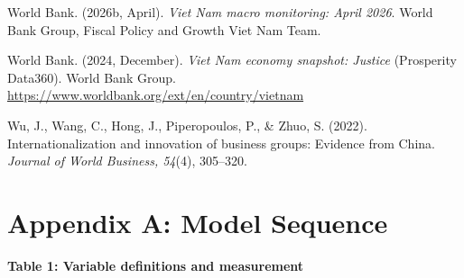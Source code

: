 \documentclass[
  12pt]{article}
\begin{document}
World Bank. (2026b, April). \emph{Viet Nam macro monitoring: April
2026}. World Bank Group, Fiscal Policy and Growth Viet Nam Team.

World Bank. (2024, December). \emph{Viet Nam economy snapshot: Justice}
(Prosperity Data360). World Bank Group.
\url{https://www.worldbank.org/ext/en/country/vietnam}

Wu, J., Wang, C., Hong, J., Piperopoulos, P., \& Zhuo, S. (2022).
Internationalization and innovation of business groups: Evidence from
China. \emph{Journal of World Business, 54}(4), 305--320.

\hypertarget{appendix-a-model-sequence}{%
\section{Appendix A: Model Sequence}\label{appendix-a-model-sequence}}

\textbf{Table 1: Variable definitions and measurement}
\end{document}
